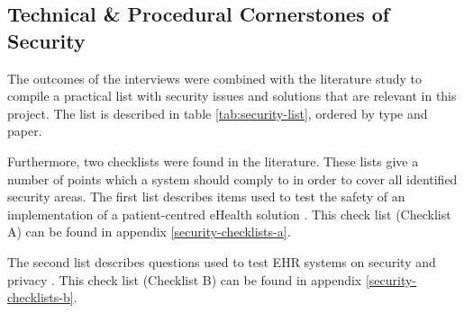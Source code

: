 \subsection{Technical \& Procedural Cornerstones of Security}
\label{security-summarisation}

The outcomes of the interviews were combined with the literature study to compile a practical list with security issues and solutions that are relevant in this project.
The list is described in table \ref{tab:security-list}, ordered by type and paper.

Furthermore, two checklists were found in the literature.
These lists give a number of points which a system should comply to in order to cover all identified security areas.
The first list describes items used to test the safety of an implementation of a patient-centred eHealth solution \cite{s17Dehling2014}.
This check list (Checklist A) can be found in appendix \ref{security-checklists-a}.

The second list describes questions used to test EHR systems on security and privacy \cite{s8FernandezAleman2013}.
This check list (Checklist B) can be found in appendix \ref{security-checklists-b}.

